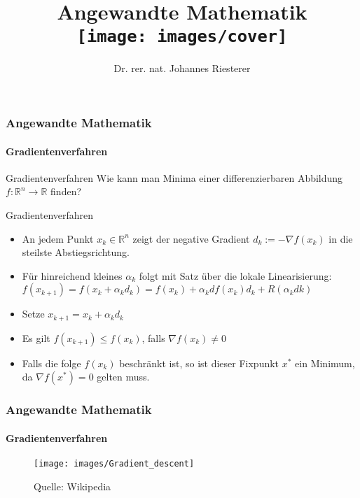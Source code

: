 \documentclass{beamer}
\begin{document}
\title[Angewandte Mathematik] %
{Angewandte Mathematik
\\
\texttt{[image: images/cover]}
}
\subtitle{}
\author[Dr. Johannes Riesterer] %
{Dr.  rer. nat. Johannes Riesterer}

\date[KPT 2004] %
{}

\subject{Angewandte Mathematik}



\frame{\titlepage}




\begin{frame}
    \frametitle{Angewandte Mathematik}
\framesubtitle{Gradientenverfahren}
    \begin{block}{Gradientenverfahren}
Wie kann man Minima einer  differenzierbaren Abbildung $f: \mathbb{R}^n \to \mathbb{R}$ finden? 
 
\end{block}

    \begin{block}{Gradientenverfahren}
\begin{itemize}
\item An jedem Punkt $x_k \in  \mathbb{R}^n$ zeigt der negative Gradient  $d_k := -\nabla f (x_k)$ in die steilste Abstiegsrichtung.
\item Für hinreichend kleines $\alpha_k$ folgt mit Satz über die lokale Linearisierung:
$f(x_{k+1}) = f (x_k + \alpha_k d_k) =  f(x_k) + \alpha_k df(x_k)d_k + R( \alpha_k dk)$
\item  Setze $x_{k+1} = x_k + \alpha_k d_k$ 
\item Es gilt $f(x_{k+1}) \leq f(x_k)$, falls $\nabla f(x_k) \neq 0$
\item  Falls die folge $f(x_k)$ beschränkt ist, so ist  dieser Fixpunkt $x^*$ ein Minimum, da $\nabla f(x^*) = 0$ gelten muss.  
\end{itemize}

\end{block}
 \end{frame}



\begin{frame}
    \frametitle{Angewandte Mathematik}
\framesubtitle{Gradientenverfahren}
\begin{figure}[H]
      \centering
    \texttt{[image: images/Gradient\_descent]}
      \caption{Quelle: Wikipedia}
\end{figure}

 \end{frame}
\end{document}
